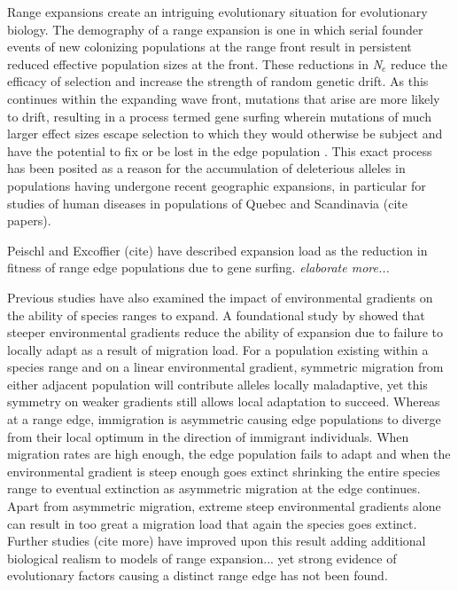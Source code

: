 Range expansions create an intriguing evolutionary situation for evolutionary biology. The demography 
of a range expansion is one in which serial founder events of new colonizing populations at the 
range front result in persistent reduced effective population sizes at the front. These reductions in 
\emph{N}$_e$ reduce the efficacy of selection and increase the strength of random genetic drift. 
As this continues within the expanding wave front, mutations that arise are more likely to drift, 
resulting in a process termed gene surfing wherein mutations of much larger effect sizes escape 
selection to which they would otherwise be subject and have the potential to fix or be lost in 
the edge population \citep{Klopfstein:2006}. This exact process has been posited as a reason for the 
accumulation of deleterious alleles in populations having undergone recent geographic expansions, 
in particular for studies of human diseases in populations of Quebec and Scandinavia (cite papers).

Peischl and Excoffier (cite) have described expansion load as the reduction in fitness of range edge populations 
due to gene surfing. \emph{elaborate more...}

Previous studies have also examined the impact of environmental gradients on the ability of species ranges to expand. 
A foundational study by \citet{Kirkpatrick:1997} showed that steeper environmental gradients reduce the ability 
of expansion due to failure to locally adapt as a result of migration load. For a population existing within a 
species range and on a linear environmental gradient, symmetric migration from either adjacent population 
will contribute alleles locally maladaptive, yet this symmetry on weaker gradients still allows local adaptation 
to succeed. Whereas at a range edge, immigration is asymmetric causing edge populations to diverge from their 
local optimum in the direction of immigrant individuals. When migration rates are high enough, the edge population fails 
to adapt and when the environmental gradient is steep enough goes extinct shrinking the entire species range to eventual 
extinction as asymmetric migration at the edge continues. Apart from asymmetric migration, extreme steep 
environmental gradients alone can result in too great a migration load that again the species goes extinct.
 Further studies (cite more) have improved upon this result adding additional biological realism 
 to models of range expansion... yet strong evidence of evolutionary factors causing a distinct range edge has 
 not been found.

